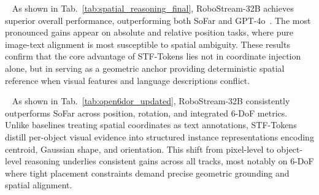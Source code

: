 ~
As shown in Tab.~\ref{tab:spatial_reasoning_final}, RoboStream-32B achieves superior overall performance, outperforming both SoFar and GPT-4o~\cite{hurst2024gpt}. The most pronounced gains appear on absolute and relative position tasks, where pure image-text alignment is most susceptible to spatial ambiguity. These results confirm that the core advantage of STF-Tokens lies not in coordinate injection alone, but in serving as a geometric anchor providing deterministic spatial reference when visual features and language descriptions conflict.



~
As shown in Tab.~\ref{tab:open6dor_updated}, RoboStream-32B consistently outperforms SoFar across position, rotation, and integrated 6-DoF metrics. Unlike baselines treating spatial coordinates as text annotations, STF-Tokens distill per-object visual evidence into structured instance representations encoding centroid, Gaussian shape, and orientation. This shift from pixel-level to object-level reasoning underlies consistent gains across all tracks, most notably on 6-DoF where tight placement constraints demand precise geometric grounding and spatial alignment.

